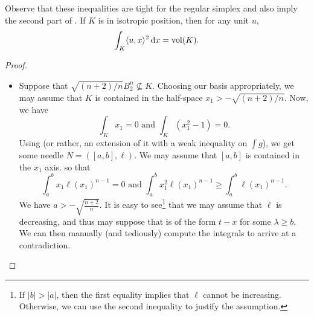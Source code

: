 		Observe that these inequalities are tight for the regular simplex and also imply the second part of . If $K$ is in isotropic position, then for any unit $u$,
		\[ \int_K \langle u,x\rangle^2 \operatorname{d}\!{x} = \operatorname{vol}(K). \]

		\begin{proof}
			\phantom{agh}
			\begin{itemize}
				\item Suppose that $\sqrt{(n+2)/n}B_2^n\not\subseteq K$. Choosing our basis appropriately, we may assume that $K$ is contained in the half-space $x_1 > -\sqrt{(n+2)/n}$. Now, we have
				\[ \int_K x_1 = 0 \text{ and } \int_K (x_1^2 - 1) = 0. \]
				Using  (or rather, an extension of it with a weak inequality on $\int g$), we get some needle $N=([a,b],\ell)$. We may assume that $[a,b]$ is contained in the $x_1$ axis. so that
				\[ \int_a^b x_1\ell(x_1)^{n-1} = 0 \text{ and } \int_a^b x_1^2\ell(x_1)^{n-1} \geq \int_a^b \ell(x_1)^{n-1}. \]
				We have $a > -\sqrt{\frac{n+2}{n}}$. It is easy to see\footnote{If $|b|>|a|$, then the first equality implies that $\ell$ cannot be increasing. Otherwise, we can use the second inequality to justify the assumption.} that we may assume that $\ell$ is decreasing, and thus may suppose that is of the form $t-x$ for some $\lambda\geq b$. We can then manually (and tediously) compute the integrals to arrive at a contradiction.


\end{itemize}
\end{proof}
